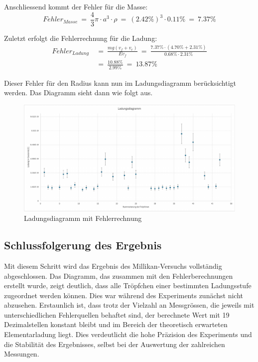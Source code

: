 \noindent Anschliessend kommt der Fehler für die Masse:
\begin{equation*}\label{eq:fehlerMasse}
	Fehler_{Masse} \ = \ \frac{4}{3} \pi \cdot a^3 \cdot \rho \ = \ (2.42\%)^3 \cdot 0.11\% \ = \ 7.37\%
\end{equation*}

\noindent Zuletzt erfolgt die Fehlerrechnung für die Ladung:
\begin{equation*}
	\begin{split}
		Fehler_{Ladung} & \ = \ \frac{mg(v_f + v_r)}{Ev_f} \ = \ \frac{7.37\% \cdot (4.70\% + 2.31\%)}{0.68\% \cdot 2.31\%} \\
		& \ = \ \frac{10.88\%}{2.99\%} \ = \ 13.87\%	
	\end{split}
\end{equation*}

\noindent Dieser Fehler für den Radius kann nun im Ladungsdiagramm berücksichtigt werden. Das Diagramm sieht dann wie folgt aus.

\begin{figure}[h]
	\centering
	\includegraphics[width=\textwidth]{bilder/pdf/LadungsdiagrammMitNeu.pdf}
	\caption{Ladungsdiagramm mit Fehlerrechnung}
	\label{fig:ladungsdiagrammMFehlerrechnung}
\end{figure}

\subsection{Schlussfolgerung des Ergebnis}\label{sub:schlussfolgerung}
Mit diesem Schritt wird das Ergebnis des Millikan-Versuchs vollständig abgeschlossen. Das Diagramm, das zusammen mit den Fehlerberechnungen erstellt wurde, zeigt deutlich, dass alle Tröpfchen einer bestimmten Ladungsstufe zugeordnet werden können. Dies war während des Experiments zunächst nicht abzusehen. Erstaunlich ist, dass trotz der Vielzahl an Messgrössen, die jeweils mit unterschiedlichen Fehlerquellen behaftet sind, der berechnete Wert mit 19 Dezimalstellen konstant bleibt und im Bereich der theoretisch erwarteten Elementarladung liegt. Dies verdeutlicht die hohe Präzision des Experiments und die Stabilität des Ergebnisses, selbst bei der Auswertung der zahlreichen Messungen. \\

